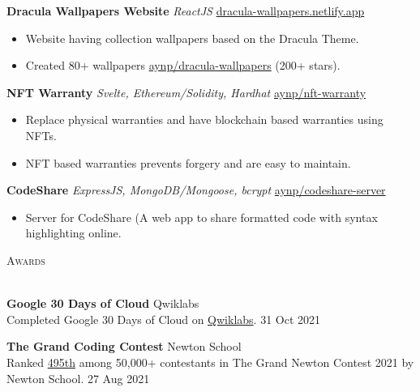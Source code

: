 \documentclass[a4paper]{article}
\newcommand{\lineunder} {
    \vspace*{-8pt} \\
    \hspace*{-18pt} \hrulefill \\
}
\newcommand{\header} [1] {
    {\hspace*{-18pt}\vspace*{6pt} \textsc{#1}}
    \vspace*{-6pt} \lineunder
}
\begin{document}
{\textbf{Dracula Wallpapers Website}} {\sl ReactJS} \hfill \href{https://dracula-wallpapers.netlify.app/}{dracula-wallpapers.netlify.app}\\
\begin{itemize}
	\item Website having collection wallpapers based on the Dracula Theme.
	\item Created 80+ wallpapers \href{https://github.com/aynp/dracula-wallpapers}{aynp/dracula-wallpapers} (200+ stars).
\end{itemize}
\vspace*{1.5mm}

{\textbf{NFT Warranty}} {\sl Svelte, Ethereum/Solidity, Hardhat} \hfill \href{https://github.com/aynp/nft-warranty}{aynp/nft-warranty}\\
\begin{itemize}
	\item Replace physical warranties and have blockchain based warranties using NFTs.
	\item NFT based warranties prevents forgery and are easy to maintain.
\end{itemize}
\vspace*{1.5mm}

{\textbf{CodeShare}} {\sl ExpressJS, MongoDB/Mongoose, bcrypt} \hfill \href{https://github.com/aynp/codeshare-server}{aynp/codeshare-server}\\
\begin{itemize}
	\item Server for CodeShare (A web app to share formatted code with syntax highlighting online.
\end{itemize}
\vspace*{1.5mm}

\header{Awards}
\vspace{1mm}

\textbf{Google 30 Days of Cloud} \hfill Qwiklabs\\
Completed Google 30 Days of Cloud on \href{https://www.qwiklabs.com/public_profiles/4c78c6d8-ad43-4991-b8fe-03e559c1bac5}{Qwiklabs}. \hfill 31 Oct 2021\\
\vspace*{1mm}

\textbf{The Grand Coding Contest} \hfill Newton School\\
Ranked \href{https://www.linkedin.com/posts/aryanpathania03_aryan-has-secured-rank-495-in-newtons-grand-activity-6841777869484642304-YhKD}{495th} among 50,000+ contestants in The Grand Newton Contest 2021 by Newton School. \hfill 27 Aug 2021\\
\vspace*{1mm}
\end{document}
